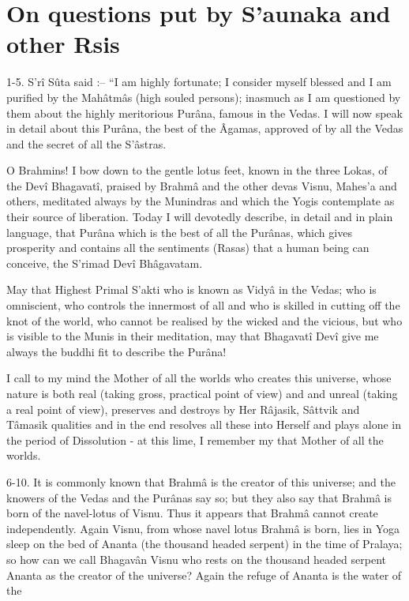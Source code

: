 \chapter{On questions put by S’aunaka and other Rsis}

1-5. S'rî Sûta said :-- “I am highly fortunate; I consider myself blessed and I am purified by the Mahâtmâs (high souled persons); inasmuch as I am questioned by them about the highly meritorious Purâna, famous in the Vedas. I will now speak in detail about this Purâna, the best of the Âgamas, approved of by all the Vedas and the secret of all the S’âstras.

 

O Brahmins! I bow down to the gentle lotus feet, known in the three Lokas, of the Devî Bhagavatî, praised by Brahmâ and the other devas Visnu, Mahes’a and others, meditated always by the Munindras and which the Yogis contemplate as their source of liberation. Today I will devotedly describe, in detail and in plain language, that Purâna which is the best of all the Purânas, which gives prosperity and contains all the sentiments (Rasas) that a human being can conceive, the S’rimad Devî Bhâgavatam.

 

May that Highest Primal S’akti who is known as Vidyâ in the Vedas; who is omniscient, who controls the innermost of all and who is skilled in cutting off the knot of the world, who cannot be realised by the wicked and the vicious, but who is visible to the Munis in their meditation, may that Bhagavatî Devî give me always the buddhi fit to describe the Purâna!

 

I call to my mind the Mother of all the worlds who creates this universe, whose nature is both real (taking  gross, practical point of view) and and unreal (taking a real point of view), preserves and destroys by Her Râjasik, Sâttvik and Tâmasik qualities and in the end resolves all these into Herself and plays alone in the period of Dissolution - at this lime, I remember my that Mother of all the worlds.

 

6-10. It is commonly known that Brahmâ is the creator of this universe; and the knowers of the Vedas and the Purânas say so; but they also say that Brahmâ is born of the navel-lotus of Visnu. Thus it appears that Brahmâ cannot create independently. Again Visnu, from whose navel lotus Brahmâ is born, lies in Yoga sleep on the bed of Ananta (the thousand headed serpent) in the time of Pralaya; so how can we call Bhagavân Visnu who rests on the thousand headed serpent Ananta as the creator of the universe? Again the refuge of Ananta is the water of the


